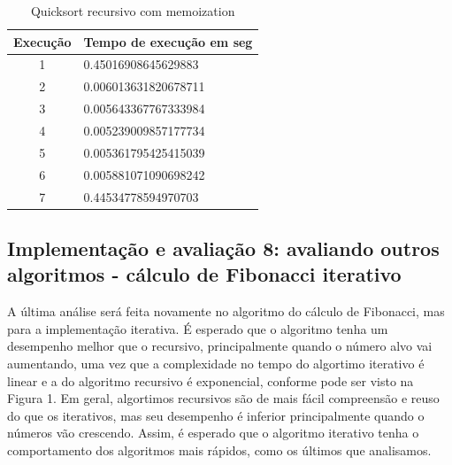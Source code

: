 \documentclass[sigconf]{acmart}
\begin{document}
\begin{table}[H]
  \caption{Quicksort recursivo com memoization}
  \label{tab:quickrccache}
  \begin{tabular}{cl}
    \toprule
    Execução & Tempo de execução em seg\\
    \midrule
    1 & 0.45016908645629883\\
    2 & 0.006013631820678711\\
    3 & 0.005643367767333984\\
    4 & 0.005239009857177734\\
    5 & 0.005361795425415039\\
    6 & 0.005881071090698242\\
    7 & 0.44534778594970703\\
  \bottomrule
\end{tabular}
\end{table}

\subsection{Implementação e avaliação 8: avaliando outros algoritmos - cálculo de Fibonacci iterativo}
A última análise será feita novamente no algoritmo do cálculo de Fibonacci, mas para a implementação iterativa. É esperado que o algoritmo tenha um desempenho melhor que o recursivo, principalmente quando o número alvo vai aumentando, uma vez que a complexidade no tempo do algortimo iterativo é linear e a do algoritmo recursivo é exponencial, conforme pode ser visto na Figura 1. Em geral, algortimos recursivos são de mais fácil compreensão e reuso do que os iterativos, mas seu desempenho é inferior principalmente quando o números vão crescendo. Assim, é esperado que o algoritmo iterativo tenha o comportamento dos algoritmos mais rápidos, como os últimos que analisamos.
\end{document}

